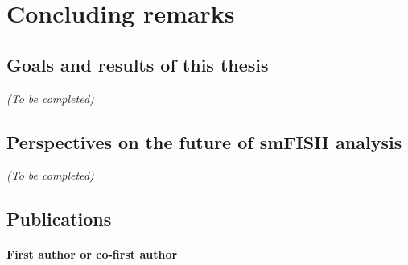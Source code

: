 
\chapter{Concluding remarks}
\label{ch:conclusion}

\minitoc
\newpage

\section{Goals and results of this thesis}
\label{sec:conclusion_thesis}

\begin{center}
	\textit{(To be completed)}
\end{center}


\section{Perspectives on the future of smFISH analysis}
\label{sec:conclusion_future}

\begin{center}
	\textit{(To be completed)}
\end{center}


\section{Publications}
\label{sec:conclusion_publications}

\subsubsection{First author or co-first author}

